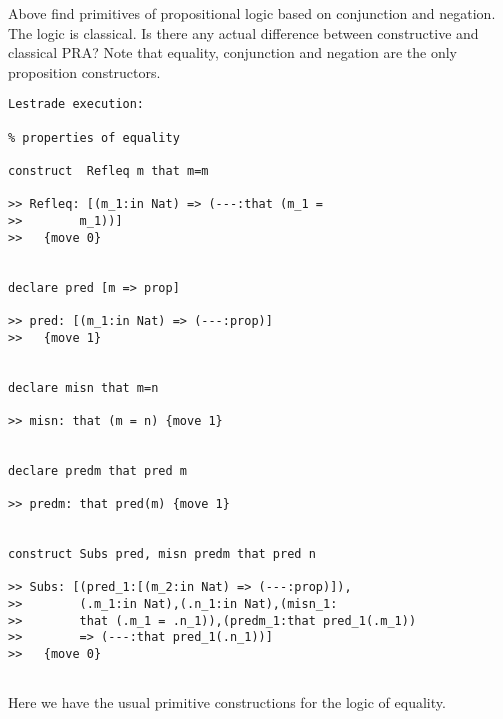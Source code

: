 \documentclass[12pt]{article}
\begin{document}
Above find primitives of propositional logic based on conjunction and negation.  The logic is classical.  Is there any actual difference between constructive and classical PRA?
Note that equality, conjunction and negation are the only proposition constructors.

\begin{verbatim}Lestrade execution:

% properties of equality

construct  Refleq m that m=m

>> Refleq: [(m_1:in Nat) => (---:that (m_1 = 
>>        m_1))]
>>   {move 0}


declare pred [m => prop]

>> pred: [(m_1:in Nat) => (---:prop)]
>>   {move 1}


declare misn that m=n

>> misn: that (m = n) {move 1}


declare predm that pred m

>> predm: that pred(m) {move 1}


construct Subs pred, misn predm that pred n

>> Subs: [(pred_1:[(m_2:in Nat) => (---:prop)]),
>>        (.m_1:in Nat),(.n_1:in Nat),(misn_1:
>>        that (.m_1 = .n_1)),(predm_1:that pred_1(.m_1)) 
>>        => (---:that pred_1(.n_1))]
>>   {move 0}


\end{verbatim}

Here we have the usual primitive constructions for the logic of equality.
\end{document}
